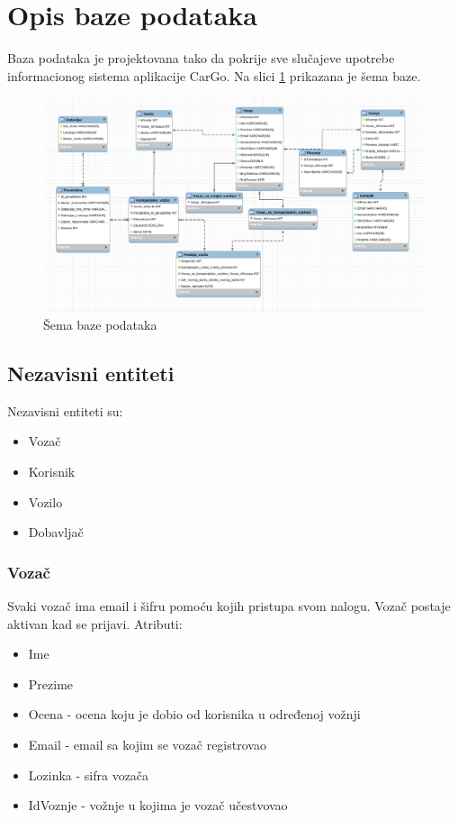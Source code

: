 \section{\bfseries Opis baze podataka}
Baza podataka je projektovana tako da pokrije sve slučajeve upotrebe informacionog sistema aplikacije CarGo. Na slici \ref{fig:bazaPodataka} prikazana je šema baze.

\begin{figure}[H]
\begin{center}
\includegraphics[width=\textwidth]{Slike/EERDijagramBazePodataka.png}
\end{center}
    \caption{Šema baze podataka}
\label{fig:bazaPodataka}
\end{figure}

\subsection{\textbf{Nezavisni entiteti}}
Nezavisni entiteti su:
\begin{itemize}
    \item Vozač
    \item Korisnik
    \item Vozilo
    \item Dobavljač
\end{itemize}

\subsubsection{\textbf{Vozač}}

Svaki vozač ima email i šifru pomoću kojih pristupa svom nalogu. Vozač postaje aktivan kad se prijavi. Atributi:
\begin{itemize}
    \item Ime
    \item Prezime
    \item Ocena - ocena koju je dobio od korisnika u određenoj vožnji
    \item Email - email sa kojim se vozač registrovao
    \item Lozinka - sifra vozača
    \item IdVoznje - vožnje u kojima je vozač učestvovao
\end{itemize}

